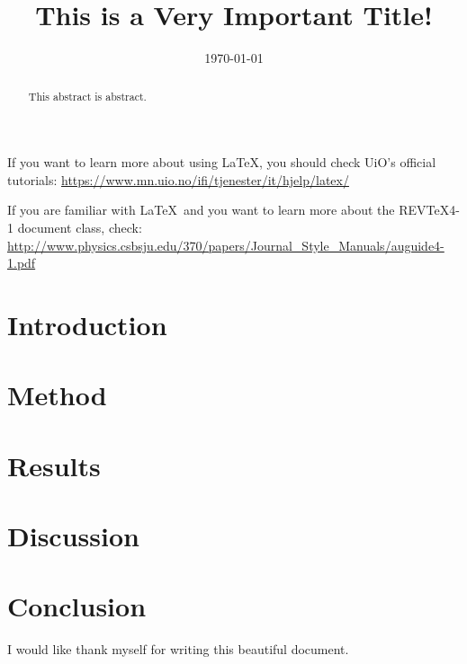 \documentclass[reprint,english,notitlepage]{revtex4-1}  %
\begin{document}
\title{This is a Very Important Title!}   %
\author{}               %
\date{\today}                             %
\noaffiliation                            %
\begin{abstract}                          %
This abstract is abstract.                %
\end{abstract}                            %
\maketitle                                %

If you want to learn more about using \LaTeX, you should check UiO's official tutorials:
\url{https://www.mn.uio.no/ifi/tjenester/it/hjelp/latex/}

If you are familiar with \LaTeX\ and you want to learn more about the REVTeX4-1 document class, check:
\url{http://www.physics.csbsju.edu/370/papers/Journal_Style_Manuals/auguide4-1.pdf}


\section{Introduction}
	
\section{Method}
\section{Results}
\section{Discussion}
\section{Conclusion}
\begin{acknowledgments}  %
I would like thank myself for writing this beautiful document.
\end{acknowledgments}
\end{document}
